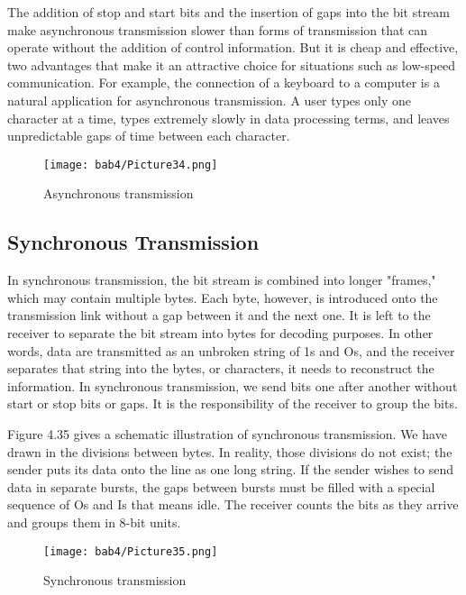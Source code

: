 The addition of stop and start bits and the insertion of gaps into the bit stream make asynchronous transmission slower than forms of transmission that can operate without the addition of control information. But it is cheap and effective, two advantages that make it an attractive choice for situations such as low-speed communication. For example, the connection of a keyboard to a computer is a natural application for asynchronous transmission. A user types only one character at a time, types extremely slowly in data processing terms, and leaves unpredictable gaps of time between each character.

\begin{figure}
  \centering
  \texttt{[image: bab4/Picture34.png]}
  \caption{Asynchronous transmission}
  \label{fig4:34}
\end{figure}


\subsection*{Synchronous Transmission}
In synchronous transmission, the bit stream is combined into longer "frames," which may contain multiple bytes. Each byte, however, is introduced onto the transmission link without a gap between it and the next one. It is left to the receiver to separate the bit stream into bytes for decoding purposes. In other words, data are transmitted as an unbroken string of 1s and Os, and the receiver separates that string into the bytes, or characters, it needs to reconstruct the information. In synchronous transmission, we send bits one after another without start or stop bits or gaps. It is the responsibility of the receiver to group the bits.

Figure 4.35 gives a schematic illustration of synchronous transmission. We have drawn in the divisions between bytes. In reality, those divisions do not exist; the sender puts its data onto the line as one long string. If the sender wishes to send data in separate bursts, the gaps between bursts must be filled with a special sequence of Os and Is that means idle. The receiver counts the bits as they arrive and groups them in 8-bit units.

\begin{figure}
  \centering
  \texttt{[image: bab4/Picture35.png]}
  \caption{Synchronous transmission}
  \label{fig4:35}
\end{figure}

